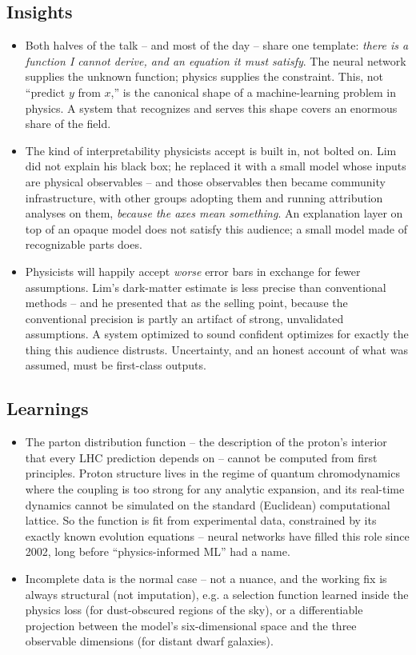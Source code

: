 \documentclass[11pt]{article}
\begin{document}
\subsection*{Insights}
\begin{itemize}
    \item Both halves of the talk -- and most of the day -- share one template: \emph{there is a function I cannot derive, and an equation it must satisfy}. The neural network supplies the unknown function; physics supplies the constraint. This, not ``predict $y$ from $x$,'' is the canonical shape of a machine-learning problem in physics. A system that recognizes and serves this shape covers an enormous share of the field.
    \item The kind of interpretability physicists accept is built in, not bolted on. Lim did not explain his black box; he replaced it with a small model whose inputs are physical observables -- and those observables then became community infrastructure, with other groups adopting them and running attribution analyses on them, \emph{because the axes mean something}. An explanation layer on top of an opaque model does not satisfy this audience; a small model made of recognizable parts does.
    \item Physicists will happily accept \emph{worse} error bars in exchange for fewer assumptions. Lim's dark-matter estimate is less precise than conventional methods -- and he presented that as the selling point, because the conventional precision is partly an artifact of strong, unvalidated assumptions. A system optimized to sound confident optimizes for exactly the thing this audience distrusts. Uncertainty, and an honest account of what was assumed, must be first-class outputs.
\end{itemize}

\subsection*{Learnings}
\begin{itemize}
    \item The parton distribution function -- the description of the proton's interior that every LHC prediction depends on -- cannot be computed from first principles. Proton structure lives in the regime of quantum chromodynamics where the coupling is too strong for any analytic expansion, and its real-time dynamics cannot be simulated on the standard (Euclidean) computational lattice. So the function is fit from experimental data, constrained by its exactly known evolution equations -- neural networks have filled this role since 2002, long before ``physics-informed ML'' had a name.
    \item Incomplete data is the normal case -- not a nuance, and the working fix is always structural (not imputation), e.g. a selection function learned inside the physics loss (for dust-obscured regions of the sky), or a differentiable projection between the model's six-dimensional space and the three observable dimensions (for distant dwarf galaxies).
\end{itemize}
\end{document}
